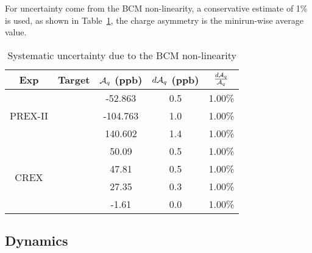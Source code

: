 For uncertainty come from the BCM non-linearity, a conservative estimate of 1\% is used,
as shown in Table~\ref{tab:AT_bcm_non-linearity}, the charge asymmetry is the 
minirun-wise average value.
\begin{table}[!h]
    \centering
    \begin{tabular}{c c | c c c}
	\hline
	Exp & Target	& $\mathcal{A}_{q}$ (ppb) & $d\mathcal{A}_{q}$ (ppb)    & $\frac{d\mathcal{A}_{q}}{\mathcal{A}_{q}}$   \\
	\hline
	\multirow{3}{*}{PREX-II}
	    & \Carbon    & -52.863   & 0.5   & 1.00\%    \\ 
	    & \ca   & -104.763  & 1.0   & 1.00\%    \\ 
	    & \Pb   & 140.602   & 1.4   & 1.00\%    \\ 
	\hline
	\multirow{4}{*}{CREX}
	    & \Carbon    & 50.09	& 0.5   & 1.00\%    \\ 
	    & \ca   & 47.81	& 0.5   & 1.00\%    \\ 
	    & \Ca   & 27.35	& 0.3   & 1.00\%    \\ 
	    & \Pb   & -1.61	& 0.0   & 1.00\%    \\ 
	\hline
    \end{tabular}
    \caption{Systematic uncertainty due to the BCM non-linearity}
    \label{tab:AT_bcm_non-linearity}
\end{table}

\subsection{Dynamics}

